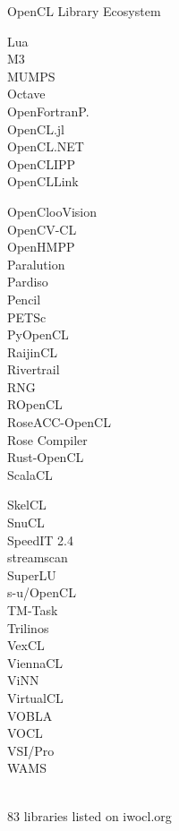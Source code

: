 \begin{frame}{OpenCL Library Ecosystem}
\begin{minipage}{0.2\textwidth}
Lua\\
M3\\
MUMPS\\
Octave\\
OpenFortranP.\\
OpenCL.jl\\
OpenCL.NET\\
OpenCLIPP\\
OpenCLLink\\
 \end{minipage}
  \begin{minipage}{0.20\textwidth}
OpenClooVision\\
OpenCV-CL\\
OpenHMPP\\
Paralution\\
Pardiso\\
Pencil\\
PETSc\\
PyOpenCL\\
RaijinCL\\
Rivertrail\\
RNG\\
ROpenCL\\
RoseACC-OpenCL\\
Rose Compiler\\
Rust-OpenCL\\
ScalaCL\\
 \end{minipage}
  \begin{minipage}{0.19\textwidth}
SkelCL\\
SnuCL\\
SpeedIT 2.4\\
streamscan\\
SuperLU\\
s-u/OpenCL\\
TM-Task\\
Trilinos\\
VexCL\\
ViennaCL\\
ViNN\\
VirtualCL\\
VOBLA\\
VOCL\\
VSI/Pro\\
WAMS\\
 \\
 \end{minipage}
 
 \begin{center}
  83 libraries listed on iwocl.org
 \end{center}
 
\end{frame}

